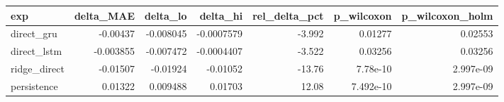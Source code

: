 \begin{tabular}{lrrrrrr}
\toprule
exp & delta\_MAE & delta\_lo & delta\_hi & rel\_delta\_pct & p\_wilcoxon & p\_wilcoxon\_holm \\
\midrule
direct\_gru & -0.00437 & -0.008045 & -0.0007579 & -3.992 & 0.01277 & 0.02553 \\
direct\_lstm & -0.003855 & -0.007472 & -0.0004407 & -3.522 & 0.03256 & 0.03256 \\
ridge\_direct & -0.01507 & -0.01924 & -0.01052 & -13.76 & 7.78e-10 & 2.997e-09 \\
persistence & 0.01322 & 0.009488 & 0.01703 & 12.08 & 7.492e-10 & 2.997e-09 \\
\bottomrule
\end{tabular}
